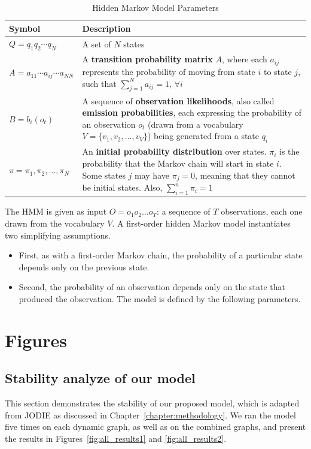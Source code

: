 \clearpage
\begin{table}[h!]
\centering
\renewcommand{\arraystretch}{1.5}
\begin{tabular}{>{\centering\arraybackslash}m{3cm}  >{\arraybackslash}m{9cm} }
\toprule
\textbf{Symbol} & \textbf{Description} \\ 
\midrule
$Q = q_1 q_2 \cdots q_N$ & A set of $N$ states \\ 
\midrule
$A = a_{11} \cdots a_{ij} \cdots a_{NN}$ & A \textbf{transition probability matrix} $A$, where each $a_{ij}$ represents the probability of moving from state $i$ to state $j$, such that $\sum_{j=1}^{N} a_{ij} = 1, \, \forall i$ \\ 
\midrule
$B = b_i(o_t)$ & A sequence of \textbf{observation likelihoods}, also called \textbf{emission probabilities}, each expressing the probability of an observation $o_t$ (drawn from a vocabulary $V = \{v_1, v_2, \ldots, v_V\}$) being generated from a state $q_i$ \\ 
\midrule
$\pi = \pi_1, \pi_2, \ldots, \pi_N$ & An \textbf{initial probability distribution} over states. $\pi_i$ is the probability that the Markov chain will start in state $i$. Some states $j$ may have $\pi_j = 0$, meaning that they cannot be initial states. Also, $\sum_{i=1}^{n} \pi_i = 1$ \\ 
\bottomrule
\end{tabular}
\caption{Hidden Markov Model Parameters}
\end{table}


The HMM is given as input $O=o_1o_2 \dots o_T$: a sequence of $T$ observations, each
one drawn from the vocabulary $V$.
A first-order hidden Markov model instantiates two simplifying assumptions.
\begin{itemize}
    \item First, as with a first-order Markov chain, the probability of a particular state depends only on the previous state.
    \item Second, the probability of an observation depends only on the state that produced the observation. The model is defined by the following parameters.
\end{itemize}




\chapter{Figures}\label{chapter:appendixB}

\section{Stability analyze of our model}
This section demonstrates the stability of our proposed model, which is adapted from JODIE as discussed in Chapter~\ref{chapter:methodology}. We ran the model five times on each dynamic graph, as well as on the combined graphs, and present the results in Figures~\ref{fig:all_results1} and \ref{fig:all_results2}.

